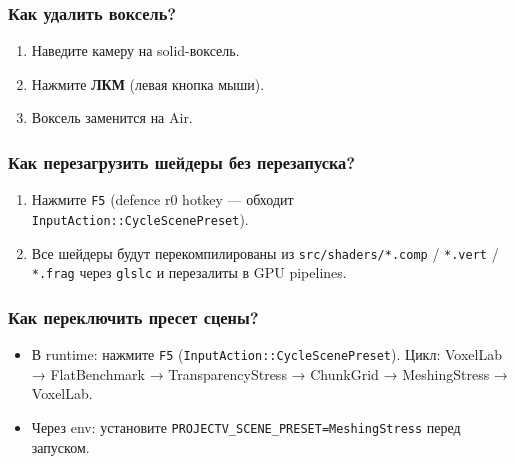 \subsubsection{Как удалить воксель?}\label{KT-3.1_User_Guide-ux43aux430ux43a-ux443ux434ux430ux43bux438ux442ux44c-ux432ux43eux43aux441ux435ux43bux44c}

\begin{enumerate}
\def\labelenumi{\arabic{enumi}.}
\tightlist
\item
  Наведите камеру на solid-воксель.
\item
  Нажмите \textbf{ЛКМ} (левая кнопка мыши).
\item
  Воксель заменится на Air.
\end{enumerate}

\subsubsection{Как перезагрузить шейдеры без перезапуска?}\label{KT-3.1_User_Guide-ux43aux430ux43a-ux43fux435ux440ux435ux437ux430ux433ux440ux443ux437ux438ux442ux44c-ux448ux435ux439ux434ux435ux440ux44b-ux431ux435ux437-ux43fux435ux440ux435ux437ux430ux43fux443ux441ux43aux430}

\begin{enumerate}
\def\labelenumi{\arabic{enumi}.}
\tightlist
\item
  Нажмите \texttt{F5} (defence r0 hotkey --- обходит \texttt{InputAction::CycleScenePreset}).
\item
  Все шейдеры будут перекомпилированы из \texttt{src/shaders/*.comp} / \texttt{*.vert} / \texttt{*.frag} через \texttt{glslc} и перезалиты в GPU pipelines.
\end{enumerate}

\subsubsection{Как переключить пресет сцены?}\label{KT-3.1_User_Guide-ux43aux430ux43a-ux43fux435ux440ux435ux43aux43bux44eux447ux438ux442ux44c-ux43fux440ux435ux441ux435ux442-ux441ux446ux435ux43dux44b}

\begin{itemize}
\tightlist
\item
  В runtime: нажмите \texttt{F5} (\texttt{InputAction::CycleScenePreset}). Цикл: VoxelLab → FlatBenchmark → TransparencyStress → ChunkGrid → MeshingStress → VoxelLab.
\item
  Через env: установите \texttt{PROJECTV\_SCENE\_PRESET=MeshingStress} перед запуском.
\end{itemize}

